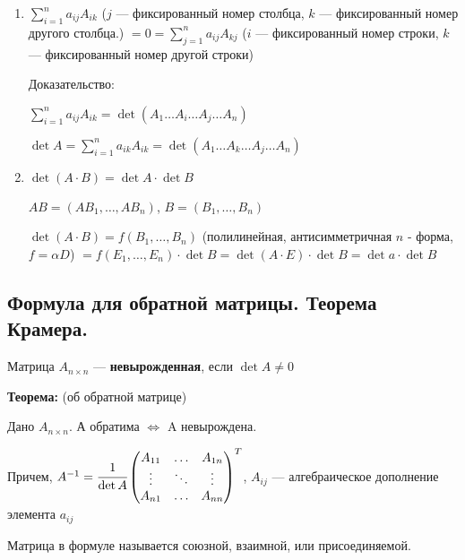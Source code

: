 \begin{enumerate}
    \item \(\sum\limits_{i = 1}^n a_{ij} A_{ik} \) (\(j\) --- фиксированный номер столбца, \(k\) --- фиксированный номер другого столбца.) \( = 0 = \sum\limits_{j = 1}^n a_{ij} A_{kj}\) (\(i\) --- фиксированный номер строки, \(k\) --- фиксированный номер другой строки)


          Доказательство:

          \( \sum\limits_{i=1}^n a_{ij}A_{ik} = \det (A_1\ldots A_i \ldots A_j\ldots A_n)\)

          \(\det A = \sum\limits_{i=1}^n a_{ik}A_{ik} = \det (A_1\ldots A_k \ldots A_j\ldots A_n)\)


    \item \(\det(A \cdot B) = \det A \cdot \det B\)

          \(AB = (AB_1, \ldots, AB_n)\), \(B = (B_1, \ldots, B_n)\)

          \(\det(A \cdot B) = f(B_1, \ldots, B_n)\) (полилинейная, антисимметричная \(n\) - форма, \(f = \alpha D\))
          \(= f(E_1, \ldots, E_n) \cdot \det B = \det(A \cdot E) \cdot \det B = \det a \cdot \det B\)

\end{enumerate}
\subsection{Формула для обратной матрицы. Теорема Крамера.}

Матрица \(A_{n \times n}\) --- \textbf{невырожденная}, если \(\det A \neq 0\)

\textbf{Теорема:} (об обратной матрице) %

Дано \(A_{n\times n}\). А обратима $\Leftrightarrow$ A невырождена. 

Причем, \(A^{-1}=\cfrac{1}{\det A} 
\begin{pmatrix}
    A_{11} & \ldots & A_{1n} \\
    \vdots & \ddots & \vdots \\
    A_{n1} & \ldots & A_{nn}
\end{pmatrix}^T\), \(A_{ij}\) --- алгебраическое дополнение элемента \(a_{ij}\)


Матрица в формуле называется союзной, взаимной, или присоединяемой.

